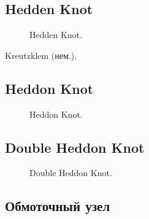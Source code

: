 \subsection{Hedden Knot}

\begin{figure}[H]\centering
	\begin{minipage}{1\linewidth}
		\begin{center}
			\tcbox[enhanced jigsaw,colframe=black,opacityframe=0.5,opacityback=0.5]
			{\centering{}}
		\end{center}
	\end{minipage}
\caption{Hedden Knot.}
\label{ris:Hedden_Knot}
\end{figure}

Kreutzklem (нем.).

\subsection{Heddon Knot}

\begin{figure}[H]\centering
	\begin{minipage}{1\linewidth}
		\begin{center}
			\tcbox[enhanced jigsaw,colframe=black,opacityframe=0.5,opacityback=0.5]
			{\centering{}}
		\end{center}
	\end{minipage}
\caption{Heddon Knot.}
\label{ris:Heddon_Knot}
\end{figure}

\subsection{Double Heddon Knot}

\begin{figure}[H]\centering
	\begin{minipage}{1\linewidth}
		\begin{center}
			\tcbox[enhanced jigsaw,colframe=black,opacityframe=0.5,opacityback=0.5]
			{\centering{}}
		\end{center}
	\end{minipage}
\caption{Double Heddon Knot.}
\label{ris:Double_Heddon_Knot}
\end{figure}

\subsection{Обмоточный узел}

